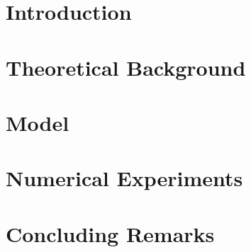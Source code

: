 \documentclass[UKenglish, 12pt, a4paper, sci, utf8, a-1b, online]{aaltothesis}
\numberwithin{equation}{section}
\numberwithin{figure}{section}
\numberwithin{theorem}{section}
\numberwithin{definition}{section}
\numberwithin{lemma}{section}
\begin{document}
\section{Introduction}


\clearpage
\section{Theoretical Background}


\clearpage
\section{Model}


\clearpage
\section{Numerical Experiments}


\clearpage
\section{Concluding Remarks}

\clearpage
\thesisappendix


\clearpage



\end{document}

